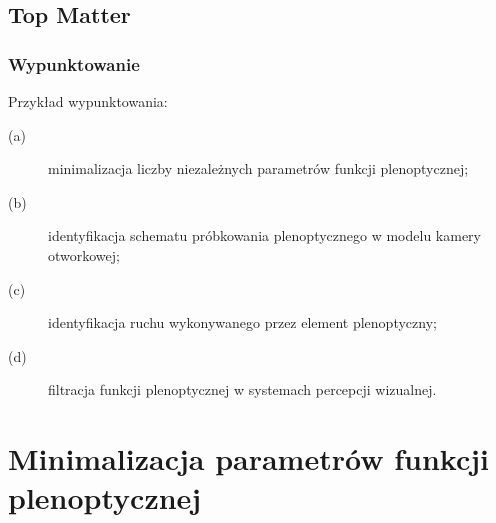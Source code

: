 \subsection{Top Matter}
\lipsum[1]

\subsubsection{Wypunktowanie}
\label{ss:ex1}

Przykład wypunktowania:

\begin{description}
	\item[(a)] minimalizacja liczby niezależnych parametrów funkcji plenoptycznej;
	\item[(b)] identyfikacja schematu próbkowania plenoptycznego w modelu kamery otworkowej;
	\item[(c)] identyfikacja ruchu wykonywanego przez element plenoptyczny;
	\item[(d)] filtracja funkcji plenoptycznej w systemach percepcji wizualnej.
\end{description}
\lipsum[1]

\section{Minimalizacja parametrów funkcji plenoptycznej}
\label{sec:mpfp}